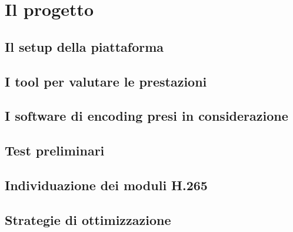 
\chapter{Il progetto} %

\label{Chapter6} %



\section{Il setup della piattaforma}


\section{I tool per valutare le prestazioni}


\section{I software di encoding presi in considerazione}


\section{Test preliminari}


\section{Individuazione dei moduli H.265}


\section{Strategie di ottimizzazione}